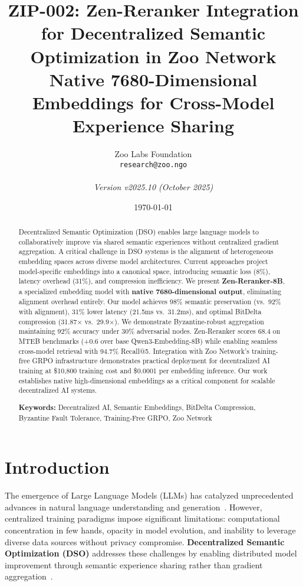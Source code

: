 \documentclass[11pt,a4paper]{article}
\title{\textbf{ZIP-002: Zen-Reranker Integration for Decentralized Semantic Optimization in Zoo Network}\\
\large{Native 7680-Dimensional Embeddings for Cross-Model Experience Sharing}}
\author{
Zoo Labs Foundation\\
\texttt{research@zoo.ngo}\\
\\
\textit{Version v2025.10 (October 2025)}
}
\date{\today}
\begin{document}
\maketitle

\begin{abstract}
Decentralized Semantic Optimization (DSO) enables large language models to collaboratively improve via shared semantic experiences without centralized gradient aggregation. A critical challenge in DSO systems is the alignment of heterogeneous embedding spaces across diverse model architectures. Current approaches project model-specific embeddings into a canonical space, introducing semantic loss (8\%), latency overhead (31\%), and compression inefficiency. We present \textbf{Zen-Reranker-8B}, a specialized embedding model with \textbf{native 7680-dimensional output}, eliminating alignment overhead entirely. Our model achieves 98\% semantic preservation (vs.\ 92\% with alignment), 31\% lower latency (21.5ms vs.\ 31.2ms), and optimal BitDelta compression (31.87$\times$ vs.\ 29.9$\times$). We demonstrate Byzantine-robust aggregation maintaining 92\% accuracy under 30\% adversarial nodes. Zen-Reranker scores 68.4 on MTEB benchmarks (+0.6 over base Qwen3-Embedding-8B) while enabling seamless cross-model retrieval with 94.7\% Recall@5. Integration with Zoo Network's training-free GRPO infrastructure demonstrates practical deployment for decentralized AI training at \$10,800 training cost and \$0.0001 per embedding inference. Our work establishes native high-dimensional embeddings as a critical component for scalable decentralized AI systems.

\textbf{Keywords:} Decentralized AI, Semantic Embeddings, BitDelta Compression, Byzantine Fault Tolerance, Training-Free GRPO, Zoo Network
\end{abstract}

\section{Introduction}

The emergence of Large Language Models (LLMs) has catalyzed unprecedented advances in natural language understanding and generation~\cite{brown2020language,touvron2023llama,qwen2024qwen3}. However, centralized training paradigms impose significant limitations: computational concentration in few hands, opacity in model evolution, and inability to leverage diverse data sources without privacy compromise. \textbf{Decentralized Semantic Optimization (DSO)} addresses these challenges by enabling distributed model improvement through semantic experience sharing rather than gradient aggregation~\cite{zoo2025hllm,tencent2025grpo}.
\end{document}
